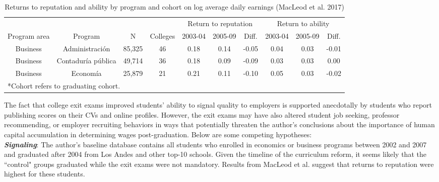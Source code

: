 \documentclass[a4paper, 11pt]{article}
\begin{document}
\begin{table}[h!]
 \begin{adjustwidth}{-.75in}{-.75in} 
 \begin{center}
 \caption{Returns to reputation and ability by program and cohort on log average daily earnings (MacLeod et al. 2017)}
 \vspace{8pt}
\begin{tabular}{cccccccccc}
\toprule
             &                    &        &          & \multicolumn{3}{c}{Return to reputation}&\multicolumn{3}{c}{Return to ability}       \\
             \cmidrule(lr){5-7} \cmidrule(lr){8-10}
Program area & Program            & N      & Colleges & 2003-04              & 2005-09 & Diff. & 2003-04           & 2005-09 & Diff. \\
\midrule
Business     & Administraci\'on     & 85,325 & 46       & 0.18                 & 0.14    & -0.05 & 0.04              & 0.03    & -0.01 \\
Business     & Contadur\'ia p\'ublica & 49,714 & 36       & 0.18                 & 0.09    & -0.09 & 0.03              & 0.03    & 0.00  \\
Business     & Econom\'ia           & 25,879 & 21       & 0.21                 & 0.11    & -0.10 & 0.05              & 0.03    & -0.02 \\
\bottomrule
\multicolumn{8}{l}{\small{*Cohort refers to graduating cohort. }}
\end{tabular}
\label{tab:macleod}
\end{center}
\end{adjustwidth}
\end{table}

The fact that college exit exams improved students' ability to signal quality to employers is supported anecdotally by students who report publishing scores on their CVs and online profiles.  However, the exit exams may have also altered student job seeking, professor recommending, or employer recruiting behaviors in ways that potentially threaten the author's conclusions about the importance of human capital accumulation in determining wages post-graduation.  Below are some competing hypotheses:
\\

\noindent \textbf{\textit{Signaling}}:  The author's baseline database contains all students who enrolled in economics or business programs between 2002 and 2007 and graduated after 2004 from Los Andes and other top-10 schools.  Given the timeline of the curriculum reform, it seems likely that the ``control" groups graduated while the exit exams were not mandatory.  Results from MacLeod et al. suggest that returns to reputation were highest for these students.  
\end{document}
